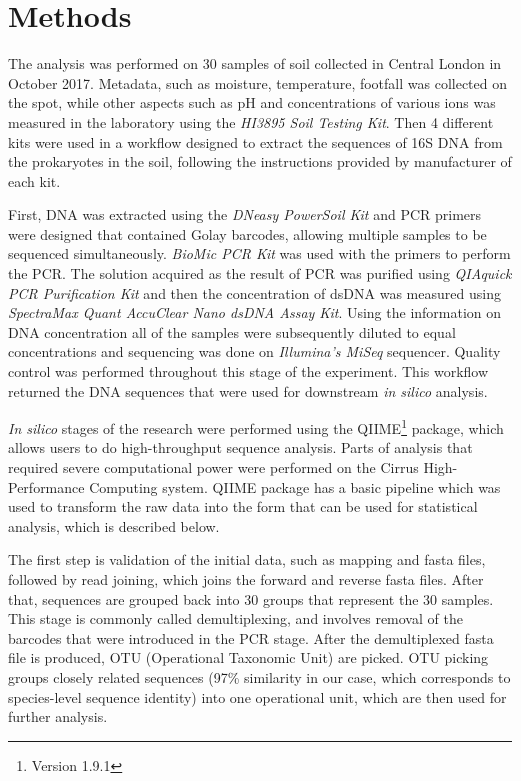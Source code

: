 \documentclass[12pt,twocolumn]{article} %
\begin{document}
\section{Methods}
The analysis was performed on 30 samples of soil collected in Central London in October 2017.  Metadata, such as moisture, temperature, footfall was collected on the spot, while other aspects such as pH and concentrations of various ions was measured in the laboratory using the \textit{HI3895 Soil Testing Kit}. Then 4 different kits were used in a workflow designed to extract the sequences of 16S DNA from the prokaryotes in the soil, following the instructions provided by manufacturer of each kit.
\par
First, DNA was extracted using the \textit{DNeasy PowerSoil Kit} and PCR primers were designed that contained Golay barcodes, allowing multiple samples to be sequenced simultaneously. \textit{BioMic PCR Kit} was used with the primers to perform the PCR. The solution acquired as the result of PCR was purified using \textit{QIAquick PCR Purification Kit} and then the concentration of dsDNA was measured using \textit{SpectraMax Quant AccuClear Nano dsDNA Assay Kit}. Using the information on DNA concentration all of the samples were subsequently diluted to equal concentrations and sequencing was done on \textit{Illumina's MiSeq} sequencer. Quality control was performed throughout this stage of the experiment. This workflow returned the DNA sequences that were used for downstream \textit{in silico} analysis.
\par
\textit{In silico} stages of the research were performed using the QIIME\footnote{Version 1.9.1} package\cite{Caporaso2010,Kuczynski2012}, which allows users to do high-throughput sequence analysis. Parts of analysis that required severe computational power were performed on the Cirrus High-Performance Computing system. QIIME package has a basic pipeline which was used to transform the raw data into the form that can be used for statistical analysis, which is described below.
\par
The first step is validation of the initial data, such as mapping and fasta files, followed by read joining, which joins the forward and reverse fasta files. After that, sequences are grouped back into 30 groups that represent the 30 samples. This stage is commonly called demultiplexing, and involves removal of the barcodes that were introduced in the PCR stage. After the demultiplexed fasta file is produced, OTU (Operational Taxonomic Unit) are picked. OTU picking groups closely related sequences (97\% similarity in our case, which corresponds to species-level sequence identity) into one operational unit, which are then used for further analysis.
\end{document}
